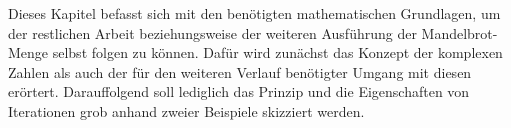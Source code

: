 
Dieses Kapitel befasst sich mit den ben\"otigten mathematischen Grundlagen, um
der restlichen Arbeit beziehungsweise der weiteren Ausführung der Mandelbrot-Menge
selbst folgen zu k\"onnen.
Daf\"ur wird zun\"achst das Konzept der komplexen Zahlen als auch der f\"ur den weiteren
Verlauf ben\"otigter Umgang mit diesen er\"ortert.
Darauffolgend soll lediglich das Prinzip und die Eigenschaften von Iterationen grob
anhand zweier Beispiele skizziert werden.


